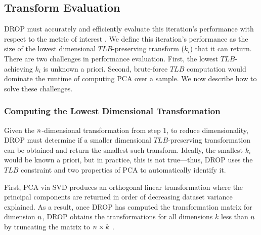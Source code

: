 \subsection{Transform Evaluation}
\label{subsec:teval}
DROP must accurately and efficiently evaluate this iteration's performance with respect to the metric of interest . 
We define this iteration's performance as the size of the lowest dimensional $TLB$-preserving transform ($k_i$) that it can return. 
There are two challenges in performance evaluation.
First, the lowest $TLB$-achieving $k_i$ is unknown a priori. 
Second, brute-force $TLB$ computation would dominate the runtime of computing PCA over a sample. 
We now describe how to solve these challenges.

\subsubsection{Computing the Lowest Dimensional Transformation}

Given the ${\color{black}n}$-dimensional transformation from step 1, to reduce dimensionality, DROP must determine if a smaller dimensional $TLB$-preserving transformation can be obtained and return the smallest such transform. 
Ideally, the smallest $k_i$ would be known a priori, but in practice, this is not true---thus, DROP uses the $TLB$ constraint and two properties of PCA to automatically identify it.

First, PCA via SVD produces an orthogonal linear transformation where the principal components  are returned in order of decreasing dataset variance explained.
As a result, once DROP has computed the transformation matrix for dimension ${\color{black}n}$, DROP obtains the transformations for all dimensions $k$ less than ${\color{black}n}$ by truncating the matrix to ${\color{black}n} \times k$ .

